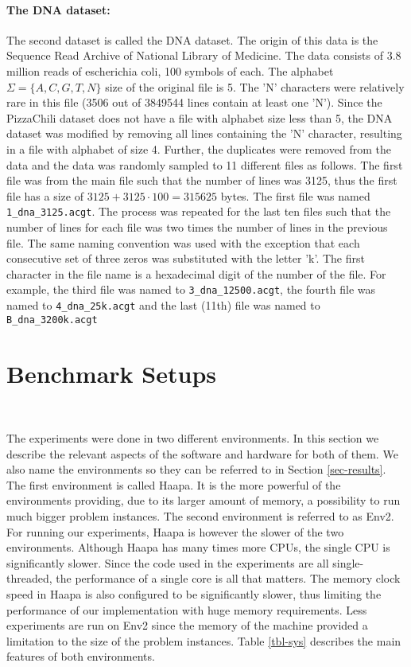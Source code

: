 \documentclass[english,twoside,censored,csm,algorithms-track-2020]{HYthesisML}
\theoremstyle{plain}
\theoremstyle{definition}
\numberwithin{testexample}{chapter}
\begin{document}
\paragraph{The DNA dataset:}
The second dataset is called the DNA dataset. The origin of this data is the Sequence Read Archive
of National Library of Medicine. The data consists of 3.8 million reads of escherichia coli,
100 symbols of each.
 The alphabet $\Sigma=\{A,C,G,T,N\}$ size of the original file is 5.
The 'N' characters were relatively rare in this file (3506 out of 3849544 lines contain at least one 'N').
Since the PizzaChili dataset does not have a
file with alphabet size less than 5, the DNA dataset was modified by removing all lines containing
the 'N' character, resulting in a file with alphabet of size 4.
Further, the duplicates were removed from the data and the data was randomly sampled to 11 different
files as follows. The first file was from the main file such that the number of lines was 3125, thus
the first file has a size of $3125+3125\cdot 100 = 315625$ bytes. The first file was named
\texttt{1\_dna\_3125.acgt}. The process was repeated for the last ten files such that the number
of lines for each file was two times the number of lines in the previous file.
The same naming convention
was used with the exception that each consecutive set of three zeros was substituted with the letter 'k'.
The first character in the file name is a hexadecimal digit of the number of the file.
For example, the third file was named to \texttt{3\_dna\_12500.acgt}, the fourth file was named
to \texttt{4\_dna\_25k.acgt} and the last (11th) file was named to \texttt{B\_dna\_3200k.acgt}

\section{Benchmark Setups}~\label{sec-env}

The experiments were done in two different environments. In this section we describe the relevant
aspects of the software and hardware for both of them. We also name the environments so they
can be referred to in Section \ref{sec-results}. The first environment is called Haapa. It is the more
powerful of the environments providing, due to its larger amount of memory, a possibility to run
much bigger problem instances. The second
environment is referred to as Env2. For running
our experiments, Haapa is however the slower of the two environments. Although Haapa has many times
more CPUs, the single CPU is significantly slower. Since the code used in the experiments
are all single-threaded, the performance of a single core is all that matters. The memory
clock speed in Haapa is also configured to be significantly slower, thus limiting the performance
of our implementation with huge memory requirements. Less experiments are run on Env2 since the
memory of the machine provided a limitation to the size of the problem instances.
Table \ref{tbl-sys} describes the main features of both environments.
\end{document}

